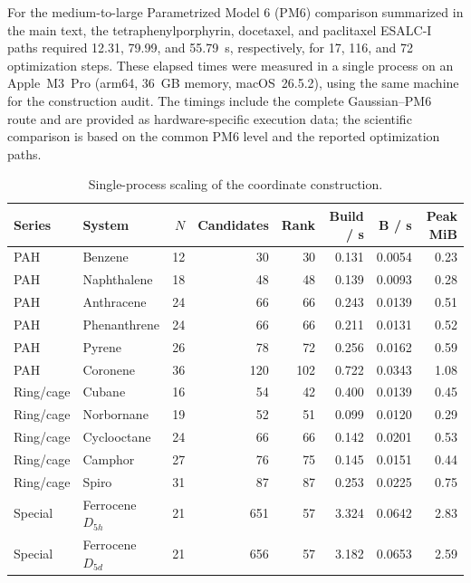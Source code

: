 \documentclass[10pt]{article}
\newcommand{\Bmat}{\mathbf{B}}
\begin{document}
For the medium-to-large {Parametrized Model 6 (PM6)} comparison
summarized in the main text, the
tetraphenylporphyrin, docetaxel, and paclitaxel ESALC-I paths required 12.31,
79.99, and 55.79~s, respectively, for 17, 116, and 72 optimization steps.
These elapsed times were measured in a single process on an Apple~M3~Pro
(arm64, 36~GB memory, macOS~26.5.2), using the same machine for the
construction audit.  The timings include the complete Gaussian--PM6 route and
are provided as hardware-specific execution data; the scientific comparison
is based on the common PM6 level and the reported optimization paths.

\begin{table}[htbp]
\centering
\scriptsize
\setlength{\tabcolsep}{3pt}
\caption{Single-process scaling of the coordinate construction.}
\label{tab:si-construction-cost}
\begin{tabular}{@{}llrrrrrr@{}}
\toprule
Series & System & \(N\) & Candidates & Rank & Build / s & \(\Bmat\) / s & Peak MiB \\
\midrule
PAH & Benzene & 12 & 30 & 30 & 0.131 & 0.0054 & 0.23 \\
PAH & Naphthalene & 18 & 48 & 48 & 0.139 & 0.0093 & 0.28 \\
PAH & Anthracene & 24 & 66 & 66 & 0.243 & 0.0139 & 0.51 \\
PAH & Phenanthrene & 24 & 66 & 66 & 0.211 & 0.0131 & 0.52 \\
PAH & Pyrene & 26 & 78 & 72 & 0.256 & 0.0162 & 0.59 \\
PAH & Coronene & 36 & 120 & 102 & 0.722 & 0.0343 & 1.08 \\
Ring/cage & Cubane & 16 & 54 & 42 & 0.400 & 0.0139 & 0.45 \\
Ring/cage & Norbornane & 19 & 52 & 51 & 0.099 & 0.0120 & 0.29 \\
Ring/cage & Cyclooctane & 24 & 66 & 66 & 0.142 & 0.0201 & 0.53 \\
Ring/cage & Camphor & 27 & 76 & 75 & 0.145 & 0.0151 & 0.44 \\
Ring/cage & Spiro & 31 & 87 & 87 & 0.253 & 0.0225 & 0.75 \\
Special & Ferrocene \(D_{5h}\) & 21 & 651 & 57 & 3.324 & 0.0642 & 2.83 \\
Special & Ferrocene \(D_{5d}\) & 21 & 656 & 57 & 3.182 & 0.0653 & 2.59 \\
\bottomrule
\end{tabular}
\end{table}
\end{document}
